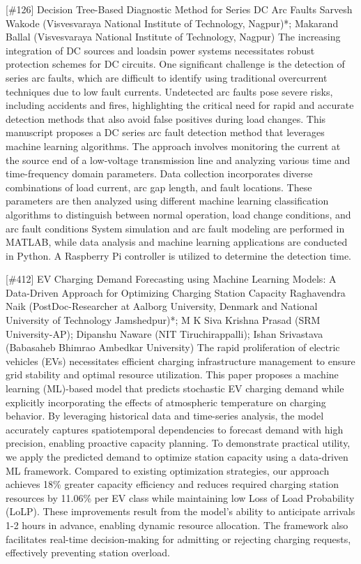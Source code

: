 {} \begin{abstract_online} {[\#126] Decision Tree-Based Diagnostic Method for Series DC Arc Faults} {} {Sarvesh Wakode (Visvesvaraya National Institute of Technology, Nagpur)*; Makarand Ballal (Visvesvaraya National Institute of Technology, Nagpur)} {} The increasing integration of DC sources and loadsin power systems necessitates robust protection schemes for DC circuits. One significant challenge is the detection of series arc faults, which are difficult to identify using traditional overcurrent techniques due to low fault currents. Undetected arc faults pose severe risks, including accidents and fires, highlighting the critical need for rapid and accurate detection methods that also avoid false positives during load changes. This manuscript proposes a DC series arc fault detection method that leverages machine learning algorithms. The approach involves monitoring the current at the source end of a low-voltage transmission line and analyzing various time and time-frequency domain parameters. Data collection incorporates diverse combinations of load current, arc gap length, and fault locations. These parameters are then analyzed using different machine learning classification algorithms to distinguish between normal operation, load change conditions, and arc fault conditions System simulation and arc fault modeling are performed in MATLAB, while data analysis and machine learning applications are conducted in Python. A Raspberry Pi controller is utilized to determine the detection time. \end{abstract_online} 
{} \begin{abstract_online} {[\#412] EV Charging Demand Forecasting using Machine Learning Models: A Data-Driven Approach for Optimizing Charging Station Capacity} {} {Raghavendra Naik (PostDoc-Researcher at Aalborg University, Denmark and National University of Technology Jamshedpur)*; M K Siva Krishna  Prasad (SRM University-AP); Dipanshu  Naware (NIT Tiruchirappalli); Ishan  Srivastava (Babasaheb Bhimrao Ambedkar University)} {} The rapid proliferation of electric vehicles (EVs) necessitates efficient charging infrastructure management to ensure grid stability and optimal resource utilization. This paper proposes a machine learning (ML)-based model that predicts stochastic EV charging demand while explicitly incorporating the effects of atmospheric temperature on charging behavior. By leveraging historical data and time-series analysis, the model accurately captures spatiotemporal dependencies to forecast demand with high precision, enabling proactive capacity planning. To demonstrate practical utility, we apply the predicted demand to optimize station capacity using a data-driven ML framework. Compared to existing optimization strategies, our approach achieves 18\% greater capacity efficiency and reduces required charging station resources by 11.06\% per EV class while maintaining low Loss of Load Probability (LoLP). These improvements result from the model's ability to anticipate arrivals 1-2 hours in advance, enabling dynamic resource allocation. The framework also facilitates real-time decision-making for admitting or rejecting charging requests, effectively preventing station overload. \end{abstract_online} 

